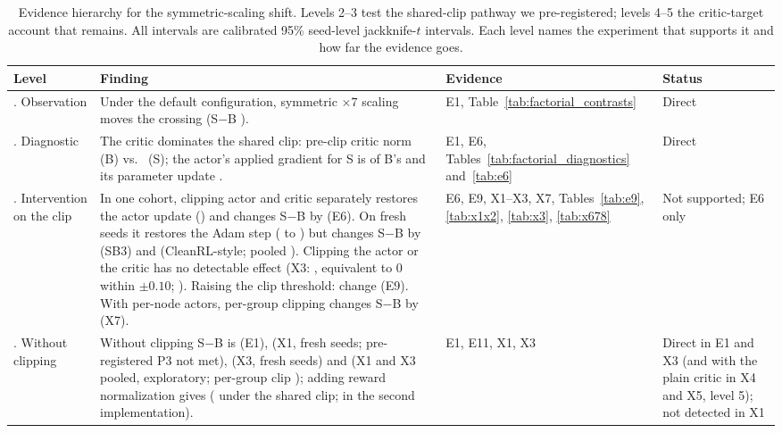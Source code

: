 \begin{table}[!htbp]
\caption{Evidence hierarchy for the symmetric-scaling shift. Levels 2--3 test the shared-clip pathway we pre-registered; levels 4--5 the critic-target account that remains. All intervals are calibrated 95\% seed-level jackknife-$t$ intervals. Each level names the experiment that supports it and how far the evidence goes.}
\label{tab:hierarchy}
\centering\footnotesize
\begin{tabular}{@{}>{\raggedright\arraybackslash}p{}>{\raggedright\arraybackslash}p{}>{\raggedright\arraybackslash}p{}>{\raggedright\arraybackslash}p{}@{}}
\toprule
Level & Finding & Evidence & Status \\
\midrule
1. Observation & Under the default configuration, symmetric $\times7$ scaling moves the crossing (S$-$B \VjtPStd{}). & E1, Table~\ref{tab:factorial_contrasts} & Direct \\
2. Diagnostic & The critic dominates the shared clip: pre-clip critic norm \VfourCriticNormB{} (B) vs.\ \VfourCriticNormS{} (S); the actor's applied gradient for S is \VsixGradGlobal{} of B's and its parameter update \VsixUpdGlobal{}. & E1, E6, Tables~\ref{tab:factorial_diagnostics} and~\ref{tab:e6} & Direct \\
3. Intervention on the clip & In one cohort, clipping actor and critic separately restores the actor update (\VsixUpdGroup{}) and changes S$-$B by \VjtChSix{} (E6). On fresh seeds it restores the Adam step (\VxoGlobStep{} to \VxoGroupStep{}) but changes S$-$B by \VxFCh{} (SB3) and \VxFTwoCh{} (CleanRL-style; pooled \VxPTwoCh{}). Clipping the actor or the critic has no detectable effect (X3: \VxtAEff{}, equivalent to 0 within $\pm0.10$; \VxtCEff{}). Raising the clip threshold: change \VjtChNineDose{} (E9). With per-node actors, per-group clipping changes S$-$B by \VxsevChGroup{} (X7). & E6, E9, X1--X3, X7, Tables~\ref{tab:e9}, \ref{tab:x1x2}, \ref{tab:x3}, \ref{tab:x678} & Not supported; E6 only \\
4. Without clipping & Without clipping S$-$B is \VjtSSep{} (E1), \VxFNone{} (X1, fresh seeds; pre-registered P3 not met), \VxtNeither{} (X3, fresh seeds) and \VxeNone{} (X1 and X3 pooled, exploratory; per-group clip \VxeGroup{}); adding reward normalization gives \VjtPSymBoth{} (\VjtSNormGlob{} under the shared clip; \VjtPElevenDefault{} in the second implementation). & E1, E11, X1, X3 & Direct in E1 and X3 (and with the plain critic in X4 and X5, level 5); not detected in X1 \\

\end{tabular}
\end{table}
